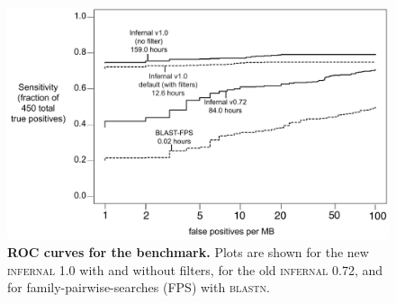 \documentclass[11pt]{article}
\begin{document}
\begin{figure}
\begin{center}
\includegraphics[width=6.4in]{figs/roc}
\caption{\textbf{ROC curves for the benchmark.}  Plots are shown for
the new \textsc{infernal} 1.0 with and without filters, for the old 
\textsc{infernal} 0.72, and for
family-pairwise-searches (FPS) with \textsc{blastn}.}
\label{fig:roc}
\end{center}
\end{figure}
\end{document}
